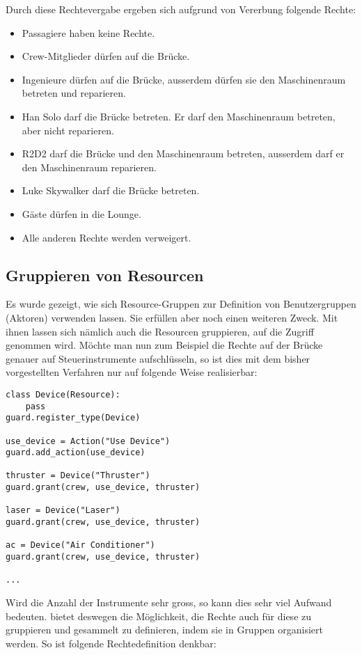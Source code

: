 Durch diese Rechtevergabe ergeben sich aufgrund von Vererbung folgende Rechte:

\begin{itemize}
\item Passagiere haben keine Rechte.
\item Crew-Mitglieder dürfen auf die Brücke.
\item Ingenieure dürfen auf die Brücke, ausserdem dürfen sie den 
Maschinenraum betreten und reparieren.
\item Han Solo darf die Brücke betreten. Er darf den Maschinenraum betreten, 
aber nicht reparieren.
\item R2D2 darf die Brücke und den Maschinenraum betreten, ausserdem darf er 
den Maschinenraum reparieren.
\item Luke Skywalker darf die Brücke betreten.
\item Gäste dürfen in die Lounge.
\item Alle anderen Rechte werden verweigert.
\end{itemize}


\subsection{Gruppieren von Resourcen}

Es wurde gezeigt, wie sich Resource-Gruppen zur Definition von 
Benutzergruppen (Aktoren) verwenden lassen. Sie erfüllen aber noch einen 
weiteren Zweck. Mit ihnen lassen sich nämlich auch die Resourcen gruppieren, 
auf die Zugriff genommen wird. Möchte man nun zum Beispiel die Rechte auf 
der Brücke genauer auf Steuerinstrumente aufschlüsseln, so ist dies mit dem 
bisher vorgestellten Verfahren nur auf folgende Weise realisierbar:

\begin{lstlisting}
class Device(Resource):
    pass
guard.register_type(Device)

use_device = Action("Use Device")
guard.add_action(use_device)

thruster = Device("Thruster")
guard.grant(crew, use_device, thruster)

laser = Device("Laser")
guard.grant(crew, use_device, thruster)

ac = Device("Air Conditioner")
guard.grant(crew, use_device, thruster)

...
\end{lstlisting}

Wird die Anzahl der Instrumente sehr gross, so kann dies sehr viel Aufwand 
bedeuten. \product bietet deswegen die Möglichkeit, die Rechte auch für 
diese zu gruppieren und gesammelt zu definieren, indem sie in Gruppen 
organisiert werden. So ist folgende Rechtedefinition denkbar:

